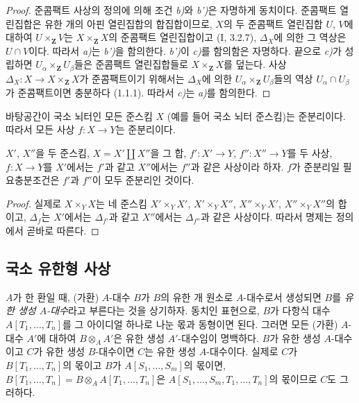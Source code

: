 \begin{proof}
준콤팩트 사상의 정의에 의해 조건 \emph{b)}와 \emph{b')}은 자명하게
동치이다. 준콤팩트 열린집합은 유한 개의 아핀 열린집합의 합집합이므로,
$X$의 두 준콤팩트 열린집합 $U$, $V$에 대하여
$U\times_{\mathbf Z}V$는 $X\times_{\mathbf Z}X$의 준콤팩트
열린집합이고 (I, 3.2.7), $\Delta_X$에 의한 그 역상은 $U\cap V$이다.
따라서 \emph{a)}는 \emph{b')}을 함의한다. \emph{b')}이
\emph{c)}를 함의함은 자명하다. 끝으로 \emph{c)}가 성립하면
$U_\alpha\times_{\mathbf Z}U_\beta$들은 준콤팩트 열린집합들로
$X\times_{\mathbf Z}X$를 덮는다. 사상
$\Delta_X:X\to X\times_{\mathbf Z}X$가 준콤팩트이기 위해서는
$\Delta_X$에 의한 $U_\alpha\times_{\mathbf Z}U_\beta$들의 역상
$U_\alpha\cap U_\beta$가 준콤팩트이면 충분하다 (1.1.1).
따라서 \emph{c)}는 \emph{a)}를 함의한다.
\end{proof}

\begin{corollary}[1.2.8]
\label{IV.1.2.8-fr}
바탕공간이 국소 뇌터인 모든 준스킴 $X$ (예를 들어 국소 뇌터
준스킴)는 준분리이다. 따라서 모든 사상 $f:X\to Y$는 준분리이다.
\end{corollary}

\begin{proposition}[1.2.9]
\label{IV.1.2.9-fr}
$X'$, $X''$을 두 준스킴, $X=X'\coprod X''$을 그 합,
$f':X'\to Y$, $f'':X''\to Y$를 두 사상, $f:X\to Y$를
$X'$에서는 $f'$과 같고 $X''$에서는 $f''$과 같은 사상이라 하자.
$f$가 준분리일 필요충분조건은 $f'$과 $f''$이 모두 준분리인 것이다.
\end{proposition}

\begin{proof}
실제로 $X\times_YX$는 네 준스킴
$X'\times_YX'$, $X'\times_YX''$, $X''\times_YX'$,
$X''\times_YX''$의 합이고, $\Delta_f$는 $X'$에서는
$\Delta_{f'}$과 같고 $X''$에서는 $\Delta_{f''}$과 같은 사상이다.
따라서 명제는 정의에서 곧바로 따른다.
\end{proof}

\subsection{국소 유한형 사상}
\label{subsection:IV.1.3-fr}

\begin{env}[1.3.1]
\label{IV.1.3.1-fr}
$A$가 한 환일 때, (가환) $A$-대수 $B$가 $B$의 유한 개 원소로
$A$-대수로서 생성되면 $B$를 \emph{유한 생성 $A$-대수}라고 부른다는 것을
상기하자. 동치인 표현으로, $B$가 다항식 대수
$A[T_1,\ldots,T_n]$를 그 아이디얼 하나로 나눈 몫과 동형이면 된다.
그러면 모든 (가환) $A$-대수 $A'$에 대하여 $B\otimes_AA'$은
유한 생성 $A'$-대수임이 명백하다. $B$가 유한 생성 $A$-대수이고 $C$가
유한 생성 $B$-대수이면 $C$는 유한 생성 $A$-대수이다. 실제로 $C$가
$B[T_1,\ldots,T_n]$의 몫이고 $B$가 $A[S_1,\ldots,S_m]$의
몫이면,
$B[T_1,\ldots,T_n]=B\otimes_AA[T_1,\ldots,T_n]$은
$A[S_1,\ldots,S_m,T_1,\ldots,T_n]$의 몫이므로 $C$도 그러하다.
\end{env}

